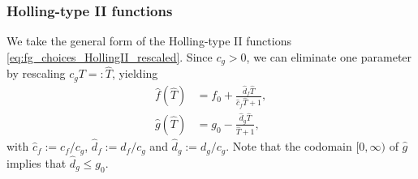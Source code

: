 \documentclass[a4paper,10pt,abstract=true,parskip=true]{scrartcl}
\theoremstyle{remark}
\numberwithin{equation}{section}
\numberwithin{thm}{section}
\begin{document}
\subsubsection{Holling-type II functions}
We take the general form of the Holling-type II functions \eqref{eq:fg_choices_HollingII_rescaled}. Since $c_g>0$, we can eliminate one parameter by rescaling $c_g T =: \hat{T}$, yielding
    \begin{subequations}
        \begin{align}
         \hat{f}(\hat{T}) &= f_0 + \frac{\hat{d}_f \hat{T}}{\hat{c}_f \hat{T}+1},\\
         \hat{g}(\hat{T}) &= g_0 - \frac{\hat{d}_g \hat{T}}{\hat{T}+1},
        \end{align}
    \end{subequations}
with $\hat{c}_f := c_f/c_g$, $\hat{d}_f := d_f/c_g$ and $\hat{d}_g := d_g/c_g$. Note that the codomain $[0,\infty)$ of $\hat{g}$ implies that $\hat{d}_g \leq g_0$.\\
\end{document}
